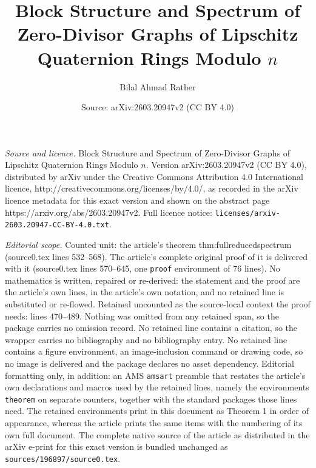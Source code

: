 \documentclass[10pt,a4paper]{amsart}
\title{Block Structure and Spectrum of Zero-Divisor Graphs of Lipschitz Quaternion Rings Modulo $n$}
\author{Bilal Ahmad Rather}
\date{Source: arXiv:2603.20947v2 (CC BY 4.0)}
\begin{document}
\maketitle

\noindent\emph{Source and licence.} Block Structure and Spectrum of Zero-Divisor Graphs of Lipschitz Quaternion Rings Modulo $n$. Version arXiv:2603.20947v2 (CC BY 4.0), distributed by arXiv under the Creative Commons Attribution 4.0 International licence, http://creativecommons.org/licenses/by/4.0/, as recorded in the arXiv licence metadata for this exact version and shown on the abstract page https://arxiv.org/abs/2603.20947v2. Full licence notice: \texttt{licenses/arxiv-2603.20947-CC-BY-4.0.txt}.\par\smallskip

\noindent\textit{Editorial scope.} Counted unit: the article's theorem thm:fullreducedspectrum (source0.tex lines 532--568). The article's complete original proof of it is delivered with it (source0.tex lines 570--645, one \texttt{proof} environment of 76 lines). No mathematics is written, repaired or re-derived: the statement and the proof are the article's own lines, in the article's own notation, and no retained line is substituted or re-flowed.  Retained uncounted as the source-local context the proof needs: lines 470--489.  Nothing was omitted from any retained span, so the package carries no omission record.  No retained line contains a citation, so the wrapper carries no bibliography and no bibliography entry.  No retained line contains a figure environment, an image-inclusion command or drawing code, so no image is delivered and the package declares no asset dependency.  Editorial formatting only, in addition: an AMS \texttt{amsart} preamble that restates the article's own declarations and macros used by the retained lines, namely the environments \texttt{theorem} on separate counters, together with the standard packages those lines need.  The retained environments print in this document as Theorem 1 in order of appearance, whereas the article prints the same items with the numbering of its own full document.  The complete native source of the article as distributed in the arXiv e-print for this exact version is bundled unchanged as \texttt{sources/196897/source0.tex}.
\end{document}
